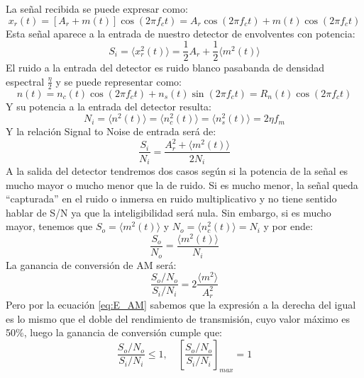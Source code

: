 \documentclass[11pt,a4paper]{article}
\numberwithin{equation}{section}
\begin{document}
La señal recibida se puede expresar como:
\begin{equation}
  x_r(t)=[A_r + m(t)]\cos(2\pi f_ct)=A_r\cos(2\pi f_ct)+m(t)\cos(2\pi f_ct)
\end{equation}
Esta señal aparece a la entrada de nuestro detector de envolventes con potencia:
\begin{equation}
  S_i=\langle x_r^2(t)\rangle =\frac{1}{2}A_r+\frac{1}{2}\langle m^2(t)\rangle 
\end{equation}
El ruido a la entrada del detector es ruido blanco pasabanda de densidad espectral $\frac{\eta}{2}$ y se puede representar como:
\begin{equation}
  n(t)=n_c(t)\cos(2\pi f_ct)+n_s(t)\sin(2\pi f_ct)=R_n(t)\cos(2\pi f_ct)
\end{equation}
Y su potencia a la entrada del detector resulta:
\begin{equation}
  N_i=\langle n^2(t)\rangle =\langle n_c^2(t)\rangle =\langle n_s^2(t)\rangle =2\eta f_m
\end{equation}
Y la relación Signal to Noise de entrada será de:
\begin{equation}
  \frac{S_i}{N_i}=\frac{A_r^2+\langle m^2(t)\rangle }{2N_i}
\end{equation}
A la salida del detector tendremos dos casos según si la potencia de la señal es mucho mayor o mucho menor que la de ruido. Si es mucho menor, la señal queda “capturada” en el ruido o inmersa en ruido multiplicativo y no tiene sentido hablar de S/N ya que la inteligibilidad será nula. Sin embargo, si es mucho mayor, tenemos que $S_o=\langle m^2(t)\rangle $ y $N_o=\langle n_c^2(t)\rangle =N_i$ y por ende:
\begin{equation}
  \frac{S_o}{N_o}=\frac{\langle m^2(t)\rangle }{N_i}
\end{equation}
La ganancia de conversión de AM será:
\begin{equation}
  \frac{S_o/N_o}{S_i/N_i} = 2\frac{\langle m^2\rangle }{A_r^2}
\end{equation}
Pero por la ecuación \eqref{eq:E_AM} sabemos que la expresión a la derecha del igual es lo mismo que el doble del rendimiento de transmisión, cuyo valor máximo es 50\%, luego la ganancia de conversión cumple que:
\begin{equation}
  \frac{S_o/N_o}{S_i/N_i}\leq1,\quad \left[\frac{S_o/N_o}{S_i/N_i}\right]_{max}=1
\end{equation}
\end{document}

